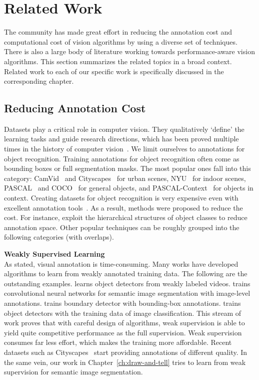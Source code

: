 \chapter{Related Work} 
\label{ch:relatedwork} 

The community has made great effort in reducing the annotation cost and computational cost of vision algorithms by using a diverse set of techniques. There is also a large body of literature working towards performance-aware vision algorithms.  This section summarizes the related topics in a broad context.  Related work to each of our specific work is specifically discussed in the corresponding chapter.  

\section{Reducing Annotation Cost}

Datasets play a critical role in computer
vision. They qualitatively `define' the learning tasks and guide
research directions, which has been proved multiple times in the history of computer vision~\citep{flow:dataset, pascal:2011, imagenet}.
 We limit ourselves to annotations for object recognition. 
 Training annotations for object recognition often come as bounding boxes or full segmentation masks. The most popular ones fall into this
category: CamVid~\citep{camvid:data} and Cityscapes~\citep{cityscapes} for urban scenes,
NYU~\citep{NYU} for indoor scenes, PASCAL~\citep{pascal:2011} and
COCO~\citep{coco:eccv} for general objects, and
PASCAL-Context~\citep{pascal:context} for objects in context.  Creating
datasets for object recognition is very expensive even with excellent annotation
tools~\citep{open:surface, label:me}. As a result, methods were
proposed to reduce the cost.  For instance, \citep{scalable:annotation,
  coco:eccv} exploit the hierarchical structures of object classes to
reduce annotation space. Other popular techniques can be roughly grouped into the following categories (with overlaps).  


\textbf{ {Weakly Supervised Learning} } \\
As stated, visual annotation is time-consuming.  Many works have developed algorithms to learn from weakly annotated training data. The following are the outstanding examples. \citep{cvpr12:weak:video} learns object detectors from weakly labeled videos. \citep{cnn:mil, cnn:em} trains convolutional neural networks for semantic image segmentation with image-level annotations.   \citep{khoreva16cvpr} trains boundary detector with bounding-box annotations.  \citep{weak:deep:detection} trains object detectors with the training data of image classification. 
This stream of work proves that with careful design of algorithms, weak supervision is able to yield quite competitive performance as the full supervision.  Weak supervision consumes far less effort, which makes the training more affordable. Recent datasets such as Cityscapes~\citep{cityscapes}  start providing annotations of different quality. In the  same vein, our work in Chapter~\ref{ch:draw-and-tell} tries to learn from weak supervision for semantic image segmentation. 
 
